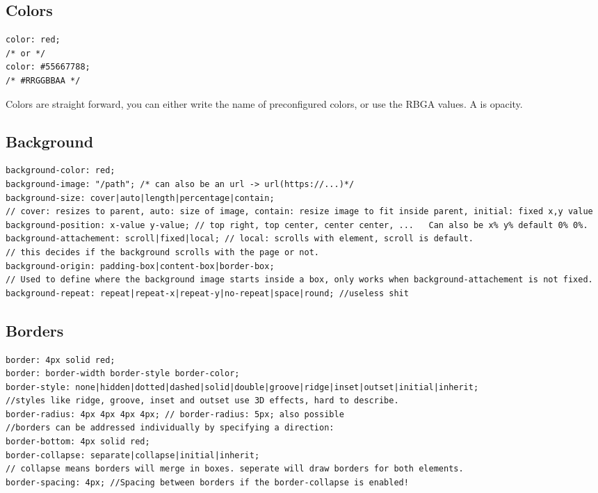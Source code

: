 \documentclass[main.tex,fontsize=6pt,paper=a4,paper=landscape,DIV=calc,]{scrartcl}
\begin{document}
\begin{multicols*}{4}
\subsection{Colors}

\vspace{-2mm}
\begin{lstlisting}
color: red;
/* or */
color: #55667788;
/* #RRGGBBAA */
\end{lstlisting}
\vspace{2mm}
Colors are straight forward, you can either write the name of preconfigured colors, or use the RBGA values. \newline A is opacity.




\subsection{Background}

\vspace{-2mm}
\begin{lstlisting}
background-color: red;
background-image: "/path"; /* can also be an url -> url(https://...)*/
background-size: cover|auto|length|percentage|contain;
// cover: resizes to parent, auto: size of image, contain: resize image to fit inside parent, initial: fixed x,y value
background-position: x-value y-value; // top right, top center, center center, ...   Can also be x% y% default 0% 0%.
background-attachement: scroll|fixed|local; // local: scrolls with element, scroll is default.
// this decides if the background scrolls with the page or not.
background-origin: padding-box|content-box|border-box; 
// Used to define where the background image starts inside a box, only works when background-attachement is not fixed.
background-repeat: repeat|repeat-x|repeat-y|no-repeat|space|round; //useless shit
\end{lstlisting}
\vspace{2mm}

\subsection{Borders}

\vspace{-2mm}
\begin{lstlisting}
border: 4px solid red;
border: border-width border-style border-color;
border-style: none|hidden|dotted|dashed|solid|double|groove|ridge|inset|outset|initial|inherit;
//styles like ridge, groove, inset and outset use 3D effects, hard to describe.
border-radius: 4px 4px 4px 4px; // border-radius: 5px; also possible
//borders can be addressed individually by specifying a direction:
border-bottom: 4px solid red;
border-collapse: separate|collapse|initial|inherit;
// collapse means borders will merge in boxes. seperate will draw borders for both elements.
border-spacing: 4px; //Spacing between borders if the border-collapse is enabled!
\end{lstlisting}
\vspace{2mm}



\end{multicols*}
\end{document}
